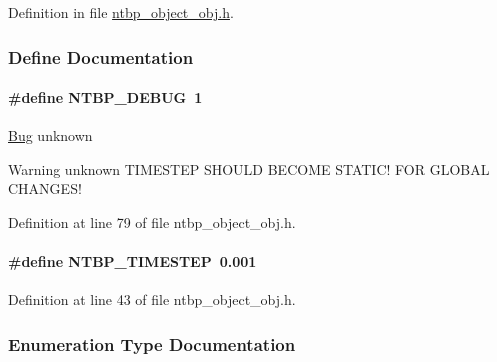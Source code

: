Definition in file \hyperlink{ntbp__object__obj_8h_source}{ntbp\_\-object\_\-obj.h}.



\subsubsection{Define Documentation}
\paragraph[{NTBP\_\-DEBUG}]{\setlength{\rightskip}{0pt plus 5cm}\#define NTBP\_\-DEBUG~1}\hfill\label{ntbp__object__obj_8h_a0f0435bc91cb273912b8ec7b3cd26a77}
\begin{Desc}
\item[\hyperlink{bug__bug000072}{Bug}]unknown \end{Desc}
\begin{DoxyWarning}{Warning}
unknown TIMESTEP SHOULD BECOME STATIC! FOR GLOBAL CHANGES! 
\end{DoxyWarning}


Definition at line 79 of file ntbp\_\-object\_\-obj.h.

\paragraph[{NTBP\_\-TIMESTEP}]{\setlength{\rightskip}{0pt plus 5cm}\#define NTBP\_\-TIMESTEP~0.001}\hfill\label{ntbp__object__obj_8h_ae0149b425a551c08e03c985d790913ea}


Definition at line 43 of file ntbp\_\-object\_\-obj.h.



\subsubsection{Enumeration Type Documentation}

